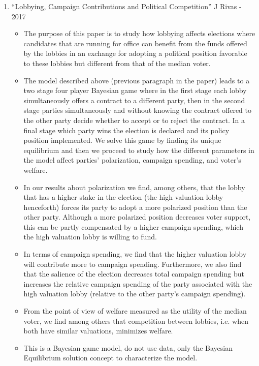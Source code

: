\documentclass[a4paper,12pt]{article}
\begin{document}
\begin{enumerate}
\item “Lobbying, Campaign Contributions and Political Competition” J Rivas - 2017   
\begin{itemize}
\item The purpose of this paper is to study how lobbying affects elections where candidates that are running for office can benefit from the funds offered by the lobbies in an exchange for adopting a political position favorable to these lobbies but different from that of the median voter.
\item The model described above (previous paragraph in the paper) leads to a two stage four player Bayesian game where in the first stage each lobby simultaneously offers a contract to a different party, then in the second stage parties simultaneously and without knowing the contract offered to the other party decide whether to accept or to reject the contract. In a final stage which party wins the election is declared and its policy position implemented. We solve this game by finding its unique equilibrium and then we proceed to study how the different parameters in the model affect parties’ polarization, campaign spending, and voter’s welfare. 
\item In our results about polarization we find, among others, that the lobby that has a higher stake in the election (the high valuation lobby henceforth) forces its party to adopt a more polarized position than the other party. Although a more polarized position decreases voter support, this can be partly compensated by a higher campaign spending, which the high valuation lobby is willing to fund. 
\item In terms of campaign spending, we find that the higher valuation lobby will contribute more to campaign spending. Furthermore, we also find that the salience of the election decreases total campaign spending but increases the relative campaign spending of the party associated with the high valuation lobby (relative to the other party’s campaign spending). 
\item From the point of view of welfare measured as the utility of the median voter, we find among others that competition between lobbies, i.e. when both have similar valuations, minimizes welfare. 
\item This is a Bayesian game model, do not use data, only the Bayesian Equilibrium solution concept to characterize the model.  

\end{itemize}



\end{enumerate}
\end{document}

